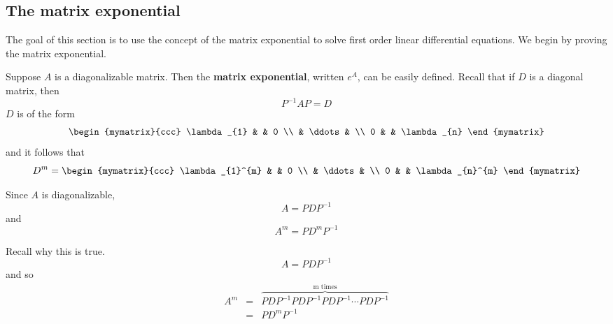 
\subsection{The matrix exponential}

The goal of this section is to use the concept of the matrix exponential to solve first order linear differential equations. We begin by proving the matrix exponential. 

Suppose $A$ is a diagonalizable matrix. Then the {\bf matrix exponential}, written $e^{A}$, can be easily defined. 
Recall that if $D$ is a diagonal matrix, then  
\begin{equation*}
P^{-1}AP=D
\end{equation*}
$D$ is of the form 
\begin{equation}
\begin{mymatrix}{ccc}
\lambda _{1} &  & 0 \\ 
& \ddots &  \\ 
0 &  & \lambda _{n}
\end{mymatrix}  \label{diagonalmatrix}
\end{equation}
and it follows that 
\begin{equation*}
D^{m}=\begin{mymatrix}{ccc}
\lambda _{1}^{m} &  & 0 \\ 
& \ddots &  \\ 
0 &  & \lambda _{n}^{m}
\end{mymatrix}
\end{equation*}

Since $A$ is diagonalizable, 
\begin{equation*}
A=PDP^{-1}
\end{equation*}
and
\begin{equation*}
A^{m}=PD^{m}P^{-1}
\end{equation*}

Recall why this is true. 
\begin{equation*}
A=PDP^{-1}
\end{equation*}
and so 
\begin{eqnarray*}
A^{m} &=&\overset{
\text{m times}}{\overbrace{PDP^{-1}PDP^{-1}PDP^{-1}\cdots PDP^{-1}}} \\
&=&PD^{m}P^{-1}
\end{eqnarray*}

